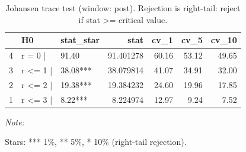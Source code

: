\begin{table}[!h]
\centering
\caption{Johansen trace test (window: post). Rejection is right-tail: reject if stat >= critical value.}
\centering
\begin{threeparttable}
\begin{tabular}[t]{lllrrrr}
\toprule
  & H0 & stat\_star & stat & cv\_1 & cv\_5 & cv\_10\\
\midrule
4 & r = 0  | & 91.40 & 91.401278 & 60.16 & 53.12 & 49.65\\
3 & r <= 1 | & 38.08*** & 38.079814 & 41.07 & 34.91 & 32.00\\
2 & r <= 2 | & 19.38*** & 19.384232 & 24.60 & 19.96 & 17.85\\
1 & r <= 3 | & 8.22*** & 8.224974 & 12.97 & 9.24 & 7.52\\
\bottomrule
\end{tabular}
\begin{tablenotes}
\item \textit{Note: } 
\item Stars: *** 1\%, ** 5\%, * 10\% (right-tail rejection).
\end{tablenotes}
\end{threeparttable}
\end{table}
